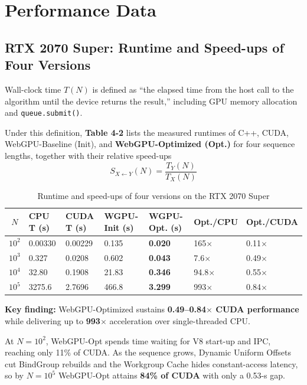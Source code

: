 \documentclass[PhD]{PHlab-thesis}
\begin{document}
\section{Performance Data}
\subsection{RTX 2070 Super: Runtime and Speed-ups of Four Versions}
Wall-clock time $T(N)$ is defined as ``the elapsed time from the host call to the algorithm until the device returns the result,'' including GPU memory allocation and \texttt{queue.submit()}.

Under this definition, \textbf{Table 4-2} lists the measured runtimes of C++, CUDA, WebGPU-Baseline (Init), and \textbf{WebGPU-Optimized (Opt.)} for four sequence lengths, together with their relative speed-ups
\[
S_{X \leftarrow Y}(N) = \frac{T_Y(N)}{T_X(N)}
\]

\begin{table}[h]
    \centering
    \begin{tabularx}{\textwidth}{|c|X|X|X|X|X|X|}
        \hline
        \setlength{\tabcolsep}{4pt}         %
        \renewcommand{\arraystretch}{2}   %
        \small    
        $N$ & CPU T (s) & CUDA T (s) & WGPU-Init (s) & \textbf{WGPU-Opt. (s)} & Opt./CPU & Opt./CUDA \\
        \hline
        $10^2$ & 0.00330 & 0.00229 & 0.135 & \textbf{0.020} & 165$\times$ & 0.11$\times$ \\
        $10^3$ & 0.327 & 0.0208 & 0.602 & \textbf{0.043} & 7.6$\times$ & 0.49$\times$ \\
        $10^4$ & 32.80 & 0.1908 & 21.83 & \textbf{0.346} & 94.8$\times$ & 0.55$\times$ \\
        $10^5$ & 3275.6 & 2.7696 & 466.8 & \textbf{3.299} & 993$\times$ & 0.84$\times$ \\
        \hline
    \end{tabularx}
    \caption{Runtime and speed-ups of four versions on the RTX 2070 Super}
    \label{tab:rtx_performance}
\end{table}

\textbf{Key finding:} WebGPU-Optimized sustains \textbf{0.49–0.84$\times$ CUDA performance} while delivering up to \textbf{993$\times$} acceleration over single-threaded CPU.

At $N=10^2$, WebGPU-Opt spends time waiting for V8 start-up and IPC, reaching only 11\% of CUDA.
As the sequence grows, Dynamic Uniform Offsets cut BindGroup rebuilds and the Workgroup Cache hides constant-access latency, so by $N=10^5$ WebGPU-Opt attains \textbf{84\% of CUDA} with only a 0.53-s gap.
\end{document}
